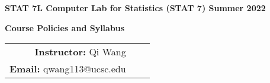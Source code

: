 \documentclass[11pt]{article}
\newcommand{\alert}[1]{\textcolor{red}{#1}}
\begin{document}
\begin{center}
{
\Large {\bf STAT 7L \hfill Computer Lab for Statistics (STAT 7) \hfill Summer 2022}
}

\vspace{.3in}
{
\Large {\bf Course Policies and Syllabus}
}
\vspace{.25in}

\begin{tabular}{rcc} 
{\bf Instructor:} Qi Wang \\
{\bf Email:} qwang113@ucsc.edu \\
\end{tabular}
\end{center}

\vspace{.2in}

\noindent%

\end{document}
